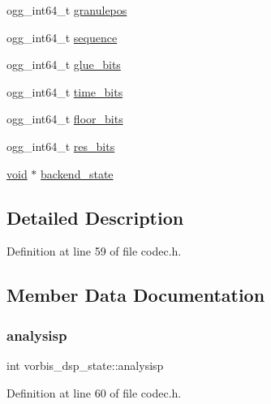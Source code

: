 \begin{DoxyCompactItemize}
\item 
ogg\+\_\+int64\+\_\+t \mbox{\hyperlink{structvorbis__dsp__state_af84a7a4855db2744d1ef73f48cb6b352}{granulepos}}
\item 
ogg\+\_\+int64\+\_\+t \mbox{\hyperlink{structvorbis__dsp__state_a38a8b96daf9d16d8cce0522e203635a6}{sequence}}
\item 
ogg\+\_\+int64\+\_\+t \mbox{\hyperlink{structvorbis__dsp__state_ae2d065c13e84870fd889c82cd2e7a04f}{glue\+\_\+bits}}
\item 
ogg\+\_\+int64\+\_\+t \mbox{\hyperlink{structvorbis__dsp__state_adef49c2187f4ed3381973274e1b01151}{time\+\_\+bits}}
\item 
ogg\+\_\+int64\+\_\+t \mbox{\hyperlink{structvorbis__dsp__state_a2913a4ebbbd6721c53264a2ca8466cea}{floor\+\_\+bits}}
\item 
ogg\+\_\+int64\+\_\+t \mbox{\hyperlink{structvorbis__dsp__state_a3091c7fac6b57c54027c32931a7e6ee0}{res\+\_\+bits}}
\item 
\mbox{\hyperlink{_s_d_l__opengles2__gl2ext_8h_ae5d8fa23ad07c48bb609509eae494c95}{void}} $\ast$ \mbox{\hyperlink{structvorbis__dsp__state_a97ff4df8d289e5e3968029e47d7f8162}{backend\+\_\+state}}
\end{DoxyCompactItemize}


\subsection{Detailed Description}


Definition at line 59 of file codec.\+h.



\subsection{Member Data Documentation}
\mbox{\label{structvorbis__dsp__state_a9b983a6901a311f2d354f2b6c51cf93b}} 
\subsubsection{\texorpdfstring{analysisp}{analysisp}}
{\footnotesize\ttfamily int vorbis\+\_\+dsp\+\_\+state\+::analysisp}



Definition at line 60 of file codec.\+h.

